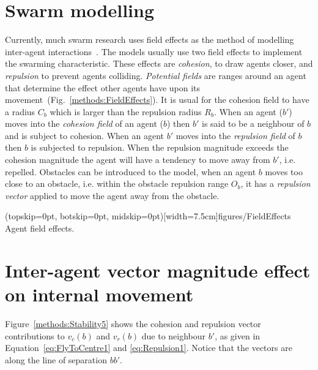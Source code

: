 \documentclass{ieeeaccess}
\begin{document}
\section{Swarm modelling}\label{Section:SwarmModelling}
Currently, much swarm research uses field effects as the method of modelling inter-agent interactions~\cite{BAF:06, BAFVM:06, BM:09, APZDAMC:09, GP:02, GP:04, GP:04a, GP:05, GP:11, MYP:09}. The models usually use two field effects to implement the swarming characteristic. These effects are \textit{cohesion}, to draw agents closer, and \textit{repulsion} to prevent agents colliding. \textit{Potential fields} are ranges around an agent that determine the effect other agents have upon its movement~(Fig.~\ref{methods:FieldEffects}). It is usual for the cohesion field to have a radius $C_b$ which is larger than the repulsion radius $R_b$. When an agent ($b'$) moves into the \textit{cohesion field} of an agent ($b$) then $b'$ is said to be a neighbour of $b$ and is subject to cohesion. When an agent $b'$ moves into the \textit{repulsion field} of $b$ then $b$ is subjected to repulsion. When the repulsion magnitude exceeds the cohesion magnitude the agent will have a tendency to move away from $b'$, i.e. repelled. Obstacles can be introduced to the model, when an agent $b$ moves too close to an obstacle, i.e. within the obstacle repulsion range $O_b$, it has a \textit{repulsion vector} applied to move the agent away from the obstacle.

\Figure[t!](topskip=0pt, botskip=0pt, midskip=0pt)[width=7.5cm]{figures/FieldEffects}
{Agent field effects.\label{methods:FieldEffects}}


\section{Inter-agent vector magnitude effect on internal movement}\label{Section:StabilityMagnitude}
Figure~\ref{methods:Stability5} shows the cohesion and repulsion vector contributions to $v_c(b)$ and $v_r(b)$ due to neighbour $b'$, as given in Equation~\ref{eq:FlyToCentre1} and \ref{eq:Repulsion1}. Notice that the vectors are along the line of separation $bb'$. \\
\end{document}
